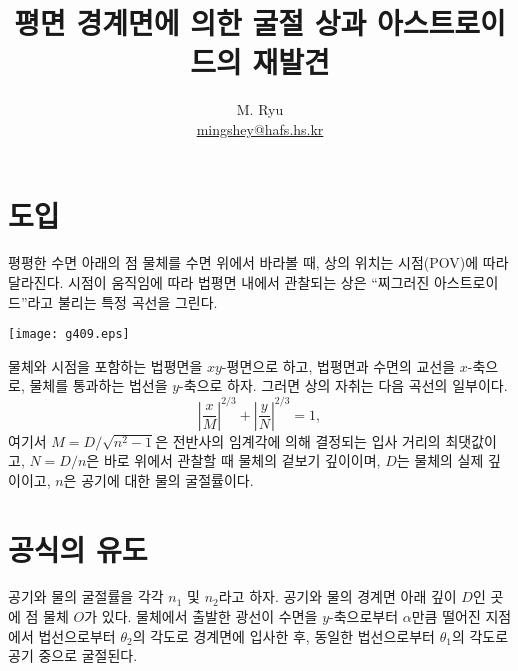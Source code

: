 \documentclass[twocolumn]{article}
\title{평면 경계면에 의한 굴절 상과 아스트로이드의 재발견}
\author{M. Ryu \\ {\href{mailto:mingshey@hafs.hs.kr}{mingshey@hafs.hs.kr}}}
\begin{document}
	\maketitle
	\section{도입}
	평평한 수면 아래의 점 물체를 수면 위에서 바라볼 때, 상의 위치는 시점(POV)에 따라 달라진다. 
	시점이 움직임에 따라 법평면 내에서 관찰되는 상은 ``찌그러진 아스트로이드''라고 불리는 특정 곡선을 그린다.
	
	\texttt{[image: g409.eps]}
	
	물체와 시점을 포함하는 법평면을 $xy$-평면으로 하고, 법평면과 수면의 교선을 $x$-축으로, 
	물체를 통과하는 법선을 $y$-축으로 하자. 그러면 상의 자취는 다음 곡선의 일부이다.
	$$ \left| \dfrac{x}{M} \right| ^ {2/3} 
	+ \left| \dfrac{y}{N} \right| ^ {2/3} = 1,$$
	여기서 $M = D/\sqrt{n^2 - 1}$은 전반사의 임계각에 의해 결정되는 입사 거리의 최댓값이고, 
	$N = D/n$은 바로 위에서 관찰할 때 물체의 겉보기 깊이이며, 
	$D$는 물체의 실제 깊이이고, $n$은 공기에 대한 물의 굴절률이다.
	
	\section{공식의 유도}
	
	공기와 물의 굴절률을 각각 $n_1$ 및 $n_2$라고 하자. 공기와 물의 경계면 아래 깊이 $D$인 곳에 점 물체 $O$가 있다. 
	물체에서 출발한 광선이 수면을 $y$-축으로부터 $\alpha$만큼 떨어진 지점에서 
	법선으로부터 $\theta_2$의 각도로 경계면에 입사한 후, 동일한 법선으로부터 $\theta_1$의 각도로 공기 중으로 굴절된다.
	
\end{document}
